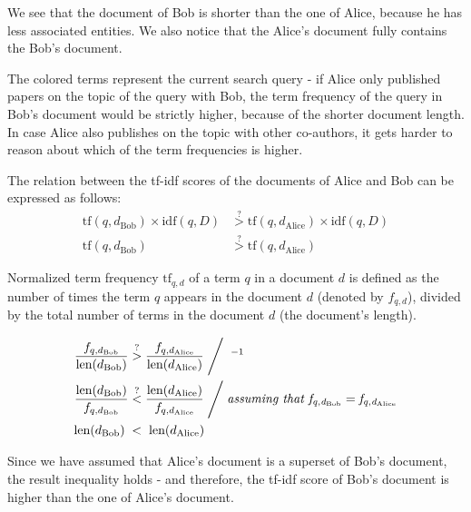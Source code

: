 We see that the document of Bob is shorter than the one of Alice, because he has less associated entities. We also notice that the Alice's document fully contains the Bob's document.
    
The colored terms represent the current search query - if Alice only published papers on the topic of the query with Bob, the term frequency of the 
query in Bob's document would be strictly higher, because of the shorter document length.
In case Alice also publishes on the topic with other co-authors, it gets harder to reason about which of the term frequencies is higher.

The relation between the tf-idf scores of the documents of Alice and Bob can be expressed as follows:
\begin{subequations}
\begin{align}
\text{tf}(q, d_{\text{Bob}}) \times \text{idf}(q, D) &\stackrel{?}{>} \text{tf}(q, d_{\text{Alice}}) \times \text{idf}(q, D) \\
\text{tf}(q, d_{\text{Bob}}) &\stackrel{?}{>} \text{tf}(q, d_{\text{Alice}})
\end{align}
\end{subequations}

Normalized term frequency $\text{tf}_{q,d}$ of a term $q$ in a document $d$ is defined as the number of times the term $q$ appears in the document $d$ (denoted by $f_{q,d}$),
divided by the total number of terms in the document $d$ (the document's length).

\begin{subequations}
\begin{align}
\frac{f_{q, d_{\text{Bob}}}}{\text{len}(d_{\text{Bob}})} &\stackrel{?}{>} \frac{f_{q, d_{\text{Alice}}}}{\text{len}(d_{\text{Alice}})} \Biggm/ \;^{-1} \\
\frac{\text{len}(d_{\text{Bob}})}{f_{q, d_{\text{Bob}}}} &\stackrel{?}{<} \frac{\text{len}(d_{\text{Alice}})}{f_{q, d_{\text{Alice}}}} \Biggm/ \textit{assuming that } \mathit{f_{q, d_{\text{Bob}}} = f_{q, d_{\text{Alice}}}} \label{eq:51assumption}\\
\text{len}(d_{\text{Bob}}) \;&<\;\text{len}(d_{\text{Alice}})
\end{align}
\end{subequations}

Since we have assumed that Alice's document is a superset of Bob's document, the result inequality holds - and therefore, the tf-idf score of Bob's document is higher than the one of Alice's document.

